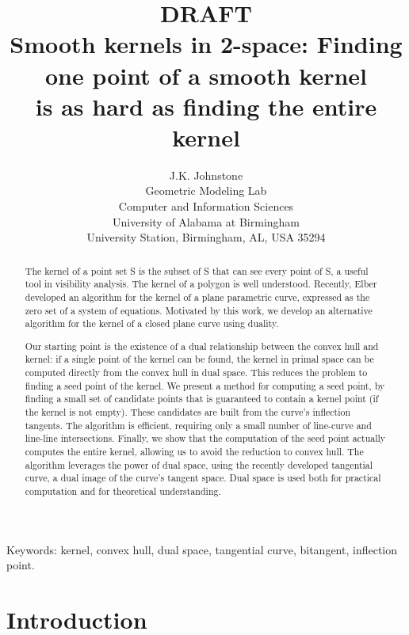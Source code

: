 \documentclass[12pt]{article}
\title{DRAFT\\Smooth kernels in 2-space:  Finding one point of a smooth kernel\\is as hard as finding the entire kernel}
\author{J.K. Johnstone\\
	Geometric Modeling Lab\\
	Computer and Information Sciences\\
	University of Alabama at Birmingham\\
	University Station, Birmingham, AL, USA 35294}
\newif\ifTalk
\begin{document}
\maketitle

\begin{abstract}
The kernel of a point set S is the subset of S that can see every point of S,
a useful tool in visibility analysis.
The kernel of a polygon is well understood.
Recently, Elber developed an algorithm for the kernel of a plane
parametric curve, expressed as the zero set of a system of equations.
Motivated by this work,
we develop an alternative algorithm for the kernel of a closed plane curve
using duality.

Our starting point is the existence of a 
dual relationship between the convex hull and kernel:
if a single point of the kernel can be found,
the kernel in primal space can be computed 
directly from the convex hull in dual space.
This reduces the problem to finding a seed point of the kernel.
We present a method for computing a seed point,
by finding a small set of candidate points
that is guaranteed to contain a kernel point (if the kernel is not empty).
These candidates are built from the curve's inflection tangents.
The algorithm is efficient, requiring only a small
number of line-curve and line-line intersections.
Finally, we show that the computation of the seed point 
actually computes the entire kernel, allowing us to avoid the
reduction to convex hull.
The algorithm leverages the power of dual space,
using the recently developed tangential curve,
a dual image of the curve's tangent space.
Dual space is used both for practical computation
and for theoretical understanding.
\end{abstract}

\ifTalk
The convex hull in dual space can be used to compute the kernel
in primal space, after some massaging.
It is this massaging that is the main topic of this paper.
\fi

Keywords: kernel, convex hull, dual space, tangential curve, bitangent,
inflection point.


\clearpage


\section{Introduction}
\end{document}
